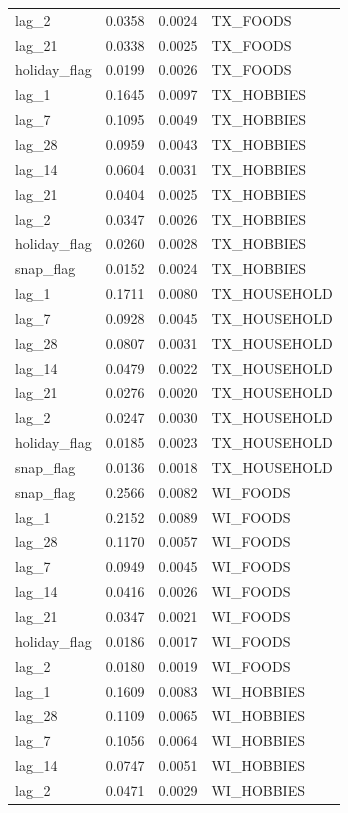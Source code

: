 \begin{table}
\begin{tabular}{lrrl}
lag_2 & 0.0358 & 0.0024 & TX_FOODS \\
lag_21 & 0.0338 & 0.0025 & TX_FOODS \\
holiday_flag & 0.0199 & 0.0026 & TX_FOODS \\
lag_1 & 0.1645 & 0.0097 & TX_HOBBIES \\
lag_7 & 0.1095 & 0.0049 & TX_HOBBIES \\
lag_28 & 0.0959 & 0.0043 & TX_HOBBIES \\
lag_14 & 0.0604 & 0.0031 & TX_HOBBIES \\
lag_21 & 0.0404 & 0.0025 & TX_HOBBIES \\
lag_2 & 0.0347 & 0.0026 & TX_HOBBIES \\
holiday_flag & 0.0260 & 0.0028 & TX_HOBBIES \\
snap_flag & 0.0152 & 0.0024 & TX_HOBBIES \\
lag_1 & 0.1711 & 0.0080 & TX_HOUSEHOLD \\
lag_7 & 0.0928 & 0.0045 & TX_HOUSEHOLD \\
lag_28 & 0.0807 & 0.0031 & TX_HOUSEHOLD \\
lag_14 & 0.0479 & 0.0022 & TX_HOUSEHOLD \\
lag_21 & 0.0276 & 0.0020 & TX_HOUSEHOLD \\
lag_2 & 0.0247 & 0.0030 & TX_HOUSEHOLD \\
holiday_flag & 0.0185 & 0.0023 & TX_HOUSEHOLD \\
snap_flag & 0.0136 & 0.0018 & TX_HOUSEHOLD \\
snap_flag & 0.2566 & 0.0082 & WI_FOODS \\
lag_1 & 0.2152 & 0.0089 & WI_FOODS \\
lag_28 & 0.1170 & 0.0057 & WI_FOODS \\
lag_7 & 0.0949 & 0.0045 & WI_FOODS \\
lag_14 & 0.0416 & 0.0026 & WI_FOODS \\
lag_21 & 0.0347 & 0.0021 & WI_FOODS \\
holiday_flag & 0.0186 & 0.0017 & WI_FOODS \\
lag_2 & 0.0180 & 0.0019 & WI_FOODS \\
lag_1 & 0.1609 & 0.0083 & WI_HOBBIES \\
lag_28 & 0.1109 & 0.0065 & WI_HOBBIES \\
lag_7 & 0.1056 & 0.0064 & WI_HOBBIES \\
lag_14 & 0.0747 & 0.0051 & WI_HOBBIES \\
lag_2 & 0.0471 & 0.0029 & WI_HOBBIES \\

\end{tabular}
\end{table}
